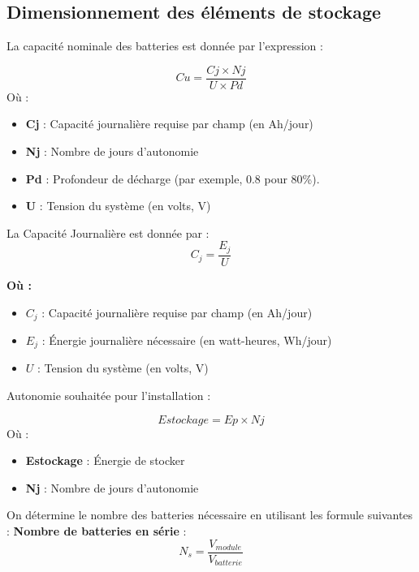 \subsection{Dimensionnement des éléments de stockage}

La capacité nominale des batteries est donnée par l’expression :


\begin{equation}
Cu = \frac{Cj \times Nj}{U \times Pd}
\end{equation}
Où :\begin{itemize}
	\item \textbf{Cj} : Capacité journalière requise par champ (en Ah/jour)
	\item \textbf{Nj} : Nombre de jours d'autonomie
	\item \textbf{Pd} : Profondeur de décharge (par exemple, 0.8 pour 80\%).
	\item \textbf{U} : Tension du système (en volts, V)
\end{itemize}
La Capacité Journalière est donnée par :
	\begin{equation}
C_j = \frac{E_j}{U}
\end{equation}


\textbf{Où :}

\begin{itemize}
	\item $C_j$ : Capacité journalière requise par champ (en Ah/jour)
	\item $E_j$ : Énergie journalière nécessaire (en watt-heures, Wh/jour)
	\item $U$ : Tension du système (en volts, V)
\end{itemize}


Autonomie souhaitée pour l'installation : 

\begin{equation}
Estockage = Ep \times Nj
\end{equation}
Où :

\begin{itemize}
	\item \textbf{Estockage} : Énergie de stocker 
	\item \textbf{Nj} : Nombre de jours d'autonomie

\end{itemize}

On détermine le nombre des batteries nécessaire en utilisant les formule suivantes : 
\textbf{Nombre de batteries en série} :
\begin{equation}
N_s = \frac{V_{module}}{V_{batterie}} 
\end{equation}


